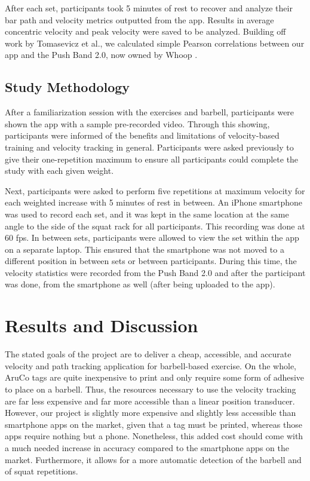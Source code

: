 \documentclass[10pt,twocolumn]{article}
\begin{document}
After each set, participants took 5 minutes of rest to recover and analyze their bar path and velocity metrics outputted from the app.
Results in average concentric velocity and peak velocity were saved to be analyzed.
Building off work by Tomasevicz et al., we calculated simple Pearson correlations between our app and the Push Band 2.0, now owned by Whoop \cite{Tomasevicz2020}.  \par

\subsection{Study Methodology}
After a familiarization session with the exercises and barbell, participants were shown the app with a sample pre-recorded video.
Through this showing, participants were informed of the benefits and limitations of velocity-based training and velocity tracking in general.
Participants were asked previously to give their one-repetition maximum to ensure all participants could complete the study with each given weight. \par

Next, participants were asked to perform five repetitions at maximum velocity for each weighted increase with 5 minutes of rest in between.
An iPhone smartphone was used to record each set, and it was kept in the same location at the same angle to the side of the squat rack for all participants.
This recording was done at 60 fps.
In between sets, participants were allowed to view the set within the app on a separate laptop.
This ensured that the smartphone was not moved to a different position in between sets or between participants.
During this time, the velocity statistics were recorded from the Push Band 2.0 and after the participant was done, from the smartphone as well (after being uploaded to the app). \par

\section{Results and Discussion}
The stated goals of the project are to deliver a cheap, accessible, and accurate velocity and path tracking application for barbell-based exercise.
On the whole, AruCo tags are quite inexpensive to print and only require some form of adhesive to place on a barbell.
Thus, the resources necessary to use the velocity tracking are far less expensive and far more accessible than a linear position transducer.
However, our project is slightly more expensive and slightly less accessible than smartphone apps on the market, given that a tag must be printed, whereas those apps require nothing but a phone.
Nonetheless, this added cost should come with a much needed increase in accuracy compared to the smartphone apps on the market.
Furthermore, it allows for a more automatic detection of the barbell and of squat repetitions.
\end{document}
